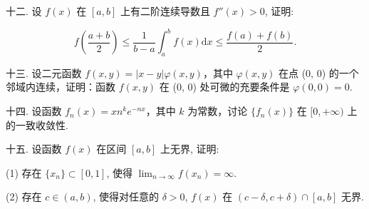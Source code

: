 \documentclass{examcollection}
\renewcommand{\displayformula}[1]{\[#1\]}
\begin{document}
{\begin{minipage}{\textwidth}
十二. 设 $f(x)$ 在 $[a, b]$ 上有二阶连续导数且 $f''(x) > 0$, 证明:\par
\displayformula{f \left(\frac {a + b}{2}\right) \leq \frac {1}{b - a} \int_ {a} ^ {b} f (x) \mathrm{d} x \leq \frac {f (a) + f (b)}{2}.}\par
十三. 设二元函数 $f(x, y) = |x - y| \varphi(x, y)$，其中 $\varphi(x, y)$ 在点 (0, 0) 的一个邻域内连续，证明：函数 $f(x, y)$ 在 (0, 0) 处可微的充要条件是 $\varphi(0, 0) = 0$.\par
十四. 设函数 $f_{n}(x) = x n^{k} e^{-nx}$，其中 $k$ 为常数，讨论 $\{f_{n}(x)\}$ 在 $[0, +\infty)$ 上的一致收敛性.\par
十五. 设函数 $f(x)$ 在区间 $[a, b]$ 上无界, 证明:\par
(1) 存在 $\{x_{n}\} \subset [0,1]$, 使得 $\lim_{n\to \infty}f(x_n) = \infty$.\par
(2) 存在 $c \in (a, b)$, 使得对任意的 $\delta > 0$, $f(x)$ 在 $(c - \delta, c + \delta) \cap [a, b]$ 无界.\par
\end{minipage}}
\ifdim\dimexpr\ht\proofbox+\dp\proofbox\relax>\textheight
\noindent\resizebox{!}{\textheight}{\usebox{\proofbox}}\else\noindent\usebox{\proofbox}\fi\clearpage
\end{document}
